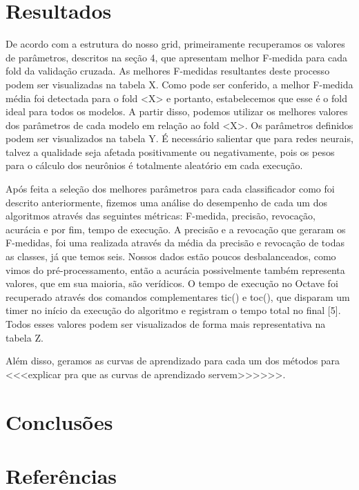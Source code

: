 \documentclass[10pt, conference, compsocconf]{IEEEtran}
\begin{document}
\section{Resultados}
De acordo com a estrutura do nosso grid, primeiramente recuperamos os valores de parâmetros, descritos na seção 4, que apresentam melhor F-medida para cada fold da validação cruzada. As melhores F-medidas resultantes deste processo podem ser visualizadas na tabela X. Como pode ser conferido, a melhor F-medida média foi detectada para o fold <X> e portanto, estabelecemos que esse é o fold ideal para todos os modelos. A partir disso, podemos utilizar os melhores valores dos parâmetros de cada modelo em relação ao fold <X>. Os parâmetros definidos podem ser visualizados na tabela Y. É necessário salientar que para redes neurais, talvez a qualidade seja afetada positivamente ou negativamente, pois os pesos para o cálculo dos neurônios é totalmente aleatório em cada execução.

Após feita a seleção dos melhores parâmetros para cada classificador como foi descrito anteriormente, fizemos uma análise do desempenho de cada um dos algoritmos através das seguintes métricas: F-medida, precisão, revocação, acurácia e por fim, tempo de execução. A precisão e a revocação que geraram os F-medidas, foi uma realizada através da média da precisão e revocação de todas as classes, já que temos seis. Nossos dados estão poucos desbalanceados, como vimos do pré-processamento, então a acurácia possivelmente também representa valores, que em sua maioria, são verídicos. O tempo de execução no Octave foi recuperado através dos comandos complementares tic() e toc(), que disparam um timer no início da execução do algoritmo e registram o tempo total no final [5]. Todos esses valores podem ser visualizados de forma mais representativa na tabela Z.

Além disso, geramos as curvas de aprendizado para cada um dos métodos para <<<explicar pra que as curvas de aprendizado servem>>>>>>. 

\section{Conclusões}


\section{Referências}
\end{document}
